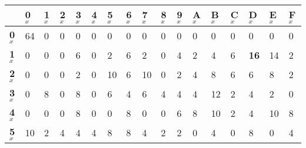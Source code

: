 \begin{longtable}[c]{|l|l|l|l|l|l|l|l|l|l|l|l|l|l|l|l|l|}
\hline
                & \textbf{0$_x$} & \textbf{1$_x$} & \textbf{2$_x$} & \textbf{3$_x$} & \textbf{4$_x$} & \textbf{5$_x$} & \textbf{6$_x$} & \textbf{7$_x$} & \textbf{8$_x$} & \textbf{9$_x$} & \textbf{A$_x$} & \textbf{B$_x$} & \textbf{C$_x$} & \textbf{D$_x$} & \textbf{E$_x$} & \textbf{F$_x$} \\ \hline
\endfirsthead
%
\endhead
%
\textbf{0$_x$}  & 64             & 0              & 0              & 0              & 0              & 0              & 0              & 0              & 0              & 0              & 0              & 0              & 0              & 0              & 0              & 0              \\ \hline
\textbf{1$_x$}  & 0              & 0              & 0              & 6              & 0              & 2              & 6              & 2              & 0              & 4              & 2              & 4              & 6              & \textbf{16}             & 14             & 2              \\ \hline
\textbf{2$_x$}  & 0              & 0              & 0              & 2              & 0              & 10             & 6              & 10             & 0              & 2              & 4              & 8              & 6              & 6              & 8              & 2              \\ \hline
\textbf{3$_x$}  & 0              & 8              & 0              & 8              & 0              & 6              & 4              & 6              & 4              & 4              & 4              & 12             & 2              & 4              & 2              & 0              \\ \hline
\textbf{4$_x$}  & 0              & 0              & 0              & 8              & 0              & 0              & 8              & 0              & 0              & 6              & 8              & 10             & 2              & 4              & 10             & 8              \\ \hline
\textbf{5$_x$}  & 10             & 2              & 4              & 4              & 4              & 8              & 8              & 4              & 2              & 2              & 0              & 4              & 0              & 8              & 0              & 4              \\ \hline

\end{longtable}
